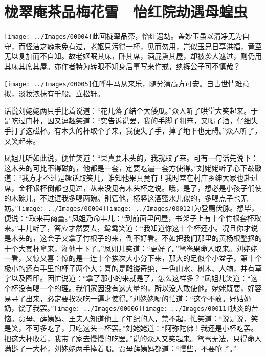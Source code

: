 

\chapter{栊翠庵茶品梅花雪　怡红院劫遇母蝗虫}\label{part0045_split_000.htmlux5cux23calibre_pb_0}

{\texttt{[image: ../Images/00004]}此回栊翠品茶，怡红遇劫。盖妙玉虽以清净无为自守，而怪洁之癖未免有过，老妪只污得一杯，见而勿用，岂似玉兄日享洪福，竟至无以复加而不自知。故老妪眠其床，卧其席，酒屁熏其屋，却被袭人遮过，则仍用其床其席其屋。亦作者特为转眼不知身后事写来作戒，纨裤公子可不慎哉？}

{\texttt{[image: ../Images/00005]}任呼牛马从来乐，随分清高方可安。自古世情难意拟，淡妆浓抹有千般。立松轩。}

话说刘姥姥两只手比着说道：``花儿落了结个大倭瓜。''众人听了哄堂大笑起来。于是吃过门杯，因又逗趣笑道：``实告诉说罢，我的手脚子粗笨，又喝了酒，仔细失手打了这磁杯。有木头的杯取个子来，我便失了手，掉了地下也无碍。''众人听了，又笑起来。

凤姐儿听如此说，便忙笑道：``果真要木头的，我就取了来。可有一句话先说下：这木头的可比不得磁的，他都是一套，定要吃遍一套方使得。''刘姥姥听了心下敁敠道：``我方才不过是趣话取笑儿，谁知他果真竟有！我时常在村庄乡绅大家也赴过席，金杯银杯倒都也见过，从来没见有木头杯之说。哦，是了，想必是小孩子们使的木碗儿，不过诓我多喝两碗。别管他，横竖这酒蜜水儿似的，多喝点子也无妨。''{\texttt{[image: ../Images/00004]}\texttt{[image: ../Images/00012]}\footnotesize \kaishu 为登厕伏脉。}想毕，便说：``取来再商量。''凤姐乃命丰儿：``到前面里间屋，书架子上有十个竹根套杯取来。''丰儿听了，答应才然要去，鸳鸯笑道：``我知道你这十个杯还小。况且你才说是木头的，这会子又拿了竹根子的来，倒不好看。不如把我们那里的黄杨根整抠的十个大套杯拿来，灌他十下子。''凤姐儿笑道：``更好了。''鸳鸯果命人取来。刘姥姥一看，又惊又喜：惊的是一连十个挨次大小分下来，那大的足似个小盆子，第十个极小的还有手里的杯子两个大；喜的是雕镂奇绝，一色山水、树木、人物，并有草字以及图印。因忙说道：``拿了那小的来就是了，怎么这样多？''凤姐儿笑道：``这个杯没有喝一个的理。我们家因没有这大量的，所以没人敢使他。姥姥既要，好容易寻了出来，必定要挨次吃一遍才使得。''刘姥姥唬的忙道：``这个不敢。好姑奶奶，饶了我罢。''{\texttt{[image: ../Images/00006]}\texttt{[image: ../Images/00011]}\footnotesize \kaishu 挟炎的苦恼。}贾母、薛姨妈、王夫人知道他上了年纪的人，禁不起，忙笑道：``说是说，笑是笑，不可多吃了，只吃这头一杯罢。''刘姥姥道：``阿弥陀佛！我还是小杯吃罢。把这大杯收着，我带了家去慢慢的吃罢。''说的众人又笑起来。鸳鸯无法，只得命人满斟了一大杯，刘姥姥两手捧着喝。贾母薛姨妈都道：``慢些，不要呛了。''

